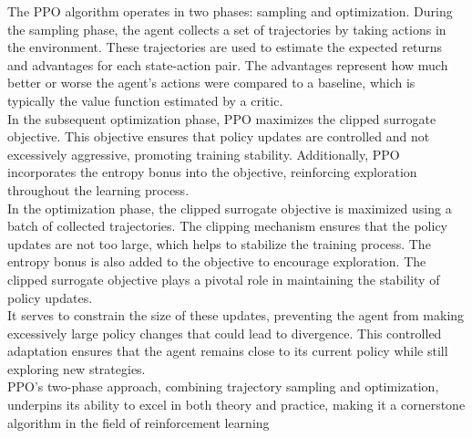 \documentclass[preprint,12pt]{elsarticle}
\begin{document}
The PPO algorithm operates in two phases: sampling and optimization. During the sampling phase, the agent collects a set of trajectories by taking actions in the environment. These trajectories are used to estimate the expected returns and advantages for each state-action pair. The advantages represent how much better or worse the agent's actions were compared to a baseline, which is typically the value function estimated by a critic.\\

In the subsequent optimization phase, PPO maximizes the clipped surrogate objective. This objective ensures that policy updates are controlled and not excessively aggressive, promoting training stability. Additionally, PPO incorporates the entropy bonus into the objective, reinforcing exploration throughout the learning process.\\

In the optimization phase, the clipped surrogate objective is maximized using a batch of collected trajectories. The clipping mechanism ensures that the policy updates are not too large, which helps to stabilize the training process. The entropy bonus is also added to the objective to encourage exploration. The clipped surrogate objective plays a pivotal role in maintaining the stability of policy updates.\\

It serves to constrain the size of these updates, preventing the agent from making excessively large policy changes that could lead to divergence. This controlled adaptation ensures that the agent remains close to its current policy while still exploring new strategies.\\
PPO's two-phase approach, combining trajectory sampling and optimization, underpins its ability to excel in both theory and practice, making it a cornerstone algorithm in the field of reinforcement learning\\
\end{document}
